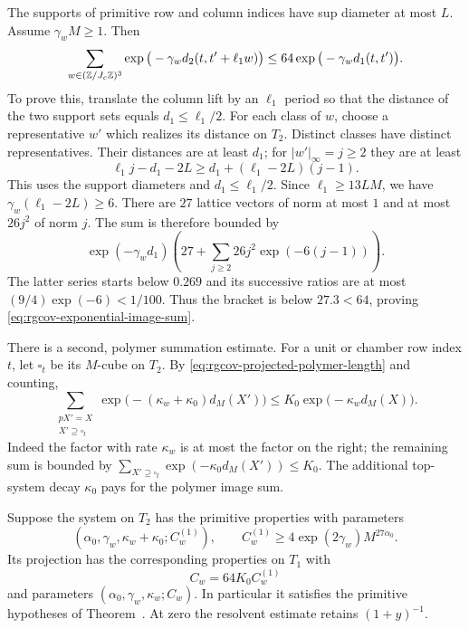 The supports of primitive row and column indices have
sup diameter at most $L$. Assume
$\gamma_wM\ge1$. Then
\begin{equation}\label{eq:rgcov-exponential-image-sum}
 \sum_{w\in(\mathbb Z/J_c\mathbb Z)^3}
     \exp\big(-\gamma_wd_2(t,t'+\ell_1w)\big)
                     \le64\exp\big(-\gamma_wd_1(t,t')\big).
\end{equation}
To prove this, translate the column lift by an
$\ell_1$ period so that the distance of the two support
sets equals $d_1\le\ell_1/2$.
For each class of $w$, choose a representative $w'$
which realizes its distance on $T_2$. Distinct classes
have distinct representatives. Their distances are
at least $d_1$; for $|w'|_\infty=j\ge2$ they are at least
\[
 \ell_1j-d_1-2L
                         \ge d_1+(\ell_1-2L)(j-1).
\]
This uses the support diameters and $d_1\le\ell_1/2$.
Since $\ell_1\ge13LM$, we have
$\gamma_w(\ell_1-2L)\ge6$.
There are $27$ lattice vectors of norm at most $1$
and at most $26j^2$ of norm $j$.
The sum is therefore bounded by
\[
 \exp(-\gamma_wd_1)
                 \left(27+\sum_{j\ge2}26j^2\exp(-6(j-1))\right).
\]
The latter series starts below $0.269$ and its
successive ratios are at most
$(9/4)\exp(-6)<1/100$. Thus the bracket is below
$27.3<64$, proving \eqref{eq:rgcov-exponential-image-sum}.

There is a second, polymer summation estimate. For a
unit or chamber row index $t$, let $\square_t$ be its
$M$-cube on $T_2$. By
\eqref{eq:rgcov-projected-polymer-length} and counting,
\begin{equation}\label{eq:rgcov-polymer-image-sum}
 \sum_{\substack{pX'=X\\X'\supseteq\square_t}}
    \exp\big(-(\kappa_w+\kappa_0)d_M(X')\big)
                 \le K_0\exp\big(-\kappa_wd_M(X)\big).
\end{equation}
Indeed the factor with rate $\kappa_w$ is at most
the factor on the right; the remaining sum is bounded
by $\sum_{X'\supseteq\square_t}\exp(-\kappa_0d_M(X'))\le K_0$.
The additional top-system decay $\kappa_0$ pays for the
polymer image sum.

\begin{proposition}\label{prop:rgcov-projected-system}
Suppose the system on $T_2$ has the primitive properties
with parameters
\[
 (\alpha_0,\gamma_w,\kappa_w+\kappa_0;C_w^{(1)}),
 \qquad C_w^{(1)}\ge4\exp(2\gamma_w)M^{27\alpha_0}.
\]
Its projection has the corresponding properties on $T_1$
with
\begin{equation}\label{eq:rgcov-common-constant}
                          C_w=64K_0C_w^{(1)}
\end{equation}
and parameters $(\alpha_0,\gamma_w,\kappa_w;C_w)$.
In particular it satisfies the primitive hypotheses of
Theorem~.
At zero the resolvent estimate retains $(1+y)^{-1}$.
\end{proposition}

